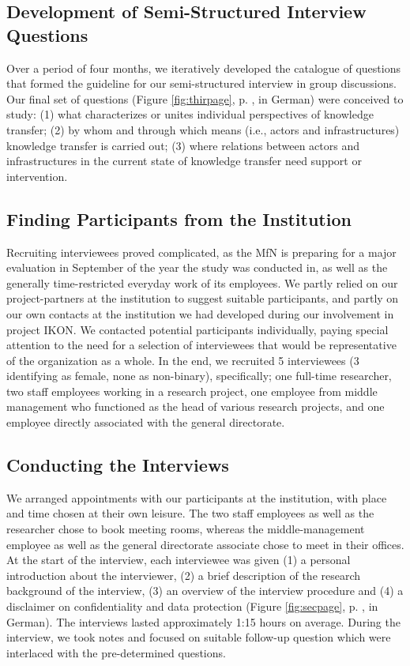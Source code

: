 \documentclass{article}
\begin{document}
\subsection{Development of Semi-Structured Interview Questions}
Over a period of four months, we iteratively developed the catalogue of questions that formed the guideline for our semi-structured interview in group discussions. Our final set of questions (Figure \ref{fig:thirpage}, p. \pageref{fig:thirpage}, in German) were conceived to study: (1) what characterizes or unites individual perspectives of knowledge transfer; (2) by whom and through which means (i.e., actors and infrastructures) knowledge transfer is carried out; (3) where relations between actors and infrastructures in the current state of knowledge transfer need support or intervention.

\subsection{Finding Participants from the Institution}
 Recruiting interviewees proved complicated, as the MfN is preparing for a major evaluation in September of the year the study was conducted in, as well as the generally time-restricted everyday work of its employees. We partly relied on our project-partners at the institution to suggest suitable participants, and partly on our own contacts at the institution we had developed during our involvement in project IKON. We contacted potential participants individually, paying special attention to the need for a selection of interviewees that would be representative of the organization as a whole. In the end, we recruited 5 interviewees (3 identifying as female, none as non-binary), specifically; one full-time researcher, two staff employees working in a research project, one employee from middle management who functioned as the head of various research projects, and one employee directly associated with the general directorate. 

\subsection{Conducting the Interviews}
We arranged appointments with our participants at the institution, with place and time chosen at their own leisure. The two staff employees as well as the researcher chose to book meeting rooms, whereas the middle-management employee as well as the general directorate associate chose to meet in their offices. At the start of the interview, each interviewee was given (1) a personal introduction about the interviewer, (2) a brief description of the research background of the interview, (3) an overview of the interview procedure and (4) a disclaimer on confidentiality and data protection (Figure \ref{fig:secpage}, p. \pageref{fig:secpage}, in German). The interviews lasted approximately 1:15 hours on average. During the interview, we took notes and focused on suitable follow-up question which were interlaced with the pre-determined questions. 
\end{document}
